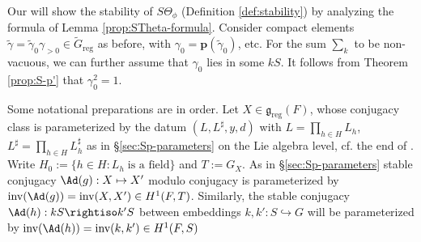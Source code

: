 \documentclass[a4paper,10pt]{article}
\begin{document}
Our will show the stability of $S\Theta_\phi$ (Definition \ref{def:stability}) by analyzing the formula of Lemma \ref{prop:STheta-formula}. Consider compact elements $\tilde{\gamma} = \tilde{\gamma}_0 \gamma_{>0} \in \tilde{G}_\text{reg}$ as before, with $\gamma_0 = \bm{p}(\tilde{\gamma}_0)$, etc. For the sum $\sum_k$ to be non-vacuous, we can further assume that $\gamma_0$ lies in some $kS$. It follows from Theorem \ref{prop:S-p'} that $\gamma_0^2 = 1$.

Some notational preparations are in order. Let $X \in \mathfrak{g}_\text{reg}(F)$, whose conjugacy class is parameterized by the datum $(L, L^\sharp, y, d)$ with $L = \prod_{h \in H} L_h$, $L^\sharp = \prod_{h \in H} L^\sharp_h$ as in \S\ref{sec:Sp-parameters} on the Lie algebra level, cf. the end of \cite[\S 3.1]{Li11}. Write $H_0 := \{h \in H: L_h \;\text{is a field} \}$ and $T := G_X$. As in \S\ref{sec:Sp-parameters} stable conjugacy $\Ad(g): X \mapsto X'$ modulo conjugacy is parameterized by $\text{inv}(\Ad(g)) = \text{inv}(X, X') \in H^1(F, T)$. Similarly, the stable conjugacy $\Ad(h): kS \rightiso k'S$ between embeddings $k,k': S \hookrightarrow G$ will be parameterized by $\text{inv}(\Ad(h)) = \text{inv}(k,k') \in H^1(F, S)$
\end{document}
